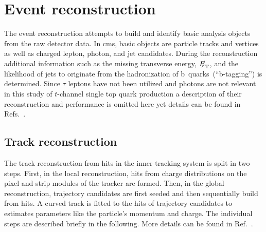 \chapter{Event reconstruction}


The event reconstruction attempts to build and identify basic analysis objects from the raw detector data. In \gls{cms}, basic objects are particle tracks and vertices as well as charged lepton, photon, and jet candidates. During the reconstruction additional information such as the missing transverse energy, ${E\!\!\!/}_{\mathrm{T}}$, and the likelihood of jets to originate from the hadronization of b~quarks~(``b-tagging'') is determined. Since $\tau$ leptons have not been utilized and photons are not relevant in this study of $t$-channel single top quark production a description of their reconstruction and performance is omitted here yet details can be found in Refs.~\cite{Khachatryan:2015dfa,Khachatryan:2015iwa}.


\section{Track reconstruction}

The track reconstruction from hits in the inner tracking system is split in two steps. First, in the local reconstruction, hits from charge distributions on the pixel and strip modules of the tracker are formed. Then, in the global reconstruction, trajectory candidates are first seeded and then sequentially build from hits. A curved track is fitted to the hits of trajectory candidates to estimates parameters like the particle's momentum and charge. The individual steps are described briefly in the following. More details can be found in Ref.~\cite{Chatrchyan:2014fea}.

